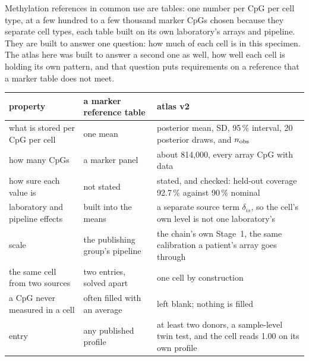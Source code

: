 Methylation references in common use are tables: one number per CpG per cell type, at a few hundred to a few thousand marker CpGs chosen
because they separate cell types, each table built on its own laboratory's arrays and pipeline. They are built to answer one question: how
much of each cell is in this specimen. The atlas here was built to answer a second one as well, how well each cell is holding its own pattern,
and that question puts requirements on a reference that a marker table does not meet.
\begin{center}\small
\begin{tabular}{@{}p{}p{}p{}@{}}\toprule
property & a marker reference table & atlas v2 \\\midrule
what is stored per CpG per cell & one mean & posterior mean, SD, 95\,\% interval, 20 posterior draws, and $n_{\rm obs}$ \\
how many CpGs & a marker panel & about 814,000, every array CpG with data \\
how sure each value is & not stated & stated, and checked: held-out coverage 92.7\,\% against 90\,\% nominal \\
laboratory and pipeline effects & built into the means & a separate source term $\delta_{is}$, so the cell's own level is not one laboratory's \\
scale & the publishing group's pipeline & the chain's own Stage~1, the same calibration a patient's array goes through \\
the same cell from two sources & two entries, solved apart & one cell by construction \\
a CpG never measured in a cell & often filled with an average & left blank; nothing is filled \\
entry & any published profile & at least two donors, a sample-level twin test, and the cell reads 1.00 on its own profile \\\bottomrule
\end{tabular}
\end{center}

